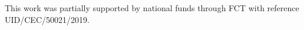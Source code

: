 \section*{\acknowledgments}


This work was partially supported by national funds through FCT with reference
UID/CEC/50021/2019.

\cleardoublepage
